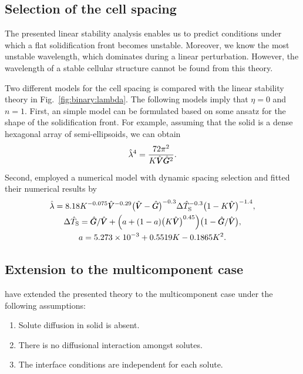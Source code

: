 \documentclass{article}
\newcommand{\sol}{\text{S}}
\newcommand{\hV}[1][\qty(\bar{V})]{\vphantom{#1}\mathrlap{\smash{\hat{V}}}V}
\newcommand{\hG}[1][\qty(\bar{G})]{\vphantom{#1}\mathrlap{\smash{\hat{G}}}G}
\begin{document}
\subsection{Selection of the cell spacing}

The presented linear stability analysis enables us to predict conditions
under which a flat solidification front becomes unstable.
Moreover, we know the most unstable wavelength, which dominates during a linear perturbation.
However, the wavelength of a stable cellular structure cannot be found from this theory.

Two different models for the cell spacing is compared with the linear stability theory
in Fig.~\ref{fig:binary:lambda}.
The following models imply that $\eta=0$ and $n=1$.
First, an simple model can be formulated based on some ansatz for the shape of the solidification front.
For example, assuming that the solid is a dense hexagonal array of semi-ellipsoids,
we can obtain~\cite{rappaz2009solidification}
\begin{equation}\label{eq:cell_spacing}
    \hat\lambda^4 = \frac{72\pi^2}{K\hV\hG^2}.
\end{equation}
Second, \textcite{hunt1996numerical} employed a numerical model with dynamic spacing selection
and fitted their numerical results by
\begin{equation}\label{eq:Hunt96}
    \begin{gathered}
        \hat\lambda = 8.18 K^{-0.075}\hV^{-0.29}\qty(\hV - \hG)^{-0.3}\Delta\hat{T}_\sol^{-0.3}\qty(1-K\hV)^{-1.4}, \\
        \Delta\hat{T}_\sol = \hG/\hV + \qty(a + (1-a)\qty(K\hV)^{0.45})\qty(1-\hG/\hV), \\
        a = \num{5.273e-3} + 0.5519K - 0.1865K^2.
    \end{gathered}
\end{equation}

\subsection{Extension to the multicomponent case}

\textcite{coriell1987stability} have extended the presented theory to the multicomponent case
under the following assumptions:
\begin{enumerate}
    \item Solute diffusion in solid is absent.
    \item There is no diffusional interaction amongst solutes.
    \item The interface conditions are independent for each solute.
\end{enumerate}
\end{document}
